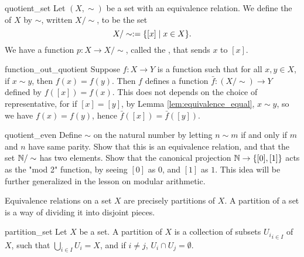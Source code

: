 \begin{cdef}{}{quotient_set}
    Let \( (X, \sim) \) be a set with an equivalence relation. We define the  of \( X \) by \( \sim \), written \( X/\sim \), to be the set
    \begin{equation*}
        X/\sim := \{ [x] \mid x \in X \}.
    \end{equation*}
    We have a function \( p : X \to X / \sim \), called the , that sends \( x \) to \( [x] \).
\end{cdef}

\begin{crem}{}{function_out_quotient}
    Suppose \( f : X \to Y \) is a function such that for all \( x, y \in X \), if \( x \sim y \), then \( f(x) = f(y) \). Then \( f \) defines a function \( \bar f : (X / \sim) \to Y \) defined by \( f([x]) = f(x) \). This does not depends on the choice of representative, for if \( [x] = [y] \), by Lemma \ref{lem:equivalence_equal}, \( x \sim y \), so we have \( f(x) = f(y) \), hence \( \bar f([x]) = \bar f([y]) \). 
\end{crem}

\begin{cex}{}{quotient_even}
    Define \( \sim \) on the natural number by letting \( n \sim m \) if and only if \( m \) and \( n \) have same parity. Show that this is an equivalence relation, and that the set \( \mathbb{N} / \sim \) has two elements. Show that the canonical projection \( \mathbb{N} \to \{ [0], [1] \} \) acts as the "mod 2" function, by seeing \( [0] \) as \( 0 \), and \( [1] \) as \( 1 \). This idea will be further generalized in the lesson on modular arithmetic.
\end{cex}

Equivalence relations on a set \( X \) are precisely partitions of \( X \). A partition of a set is a way of dividing it into disjoint pieces.
\begin{cdef}{}{partition_set}
    Let \( X \) be a set. A partition of \( X \) is a collection of subsets \( {U_i}_{i\in I} \) of \( X \), such that \( \bigcup_{i \in I} U_i = X  \), and if \( i \neq j \), \( U_i \cap U_j = \emptyset \). 
\end{cdef}

